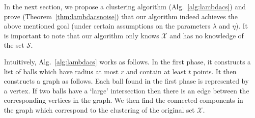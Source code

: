 \documentclass[letterpaper,12pt,titlepage,oneside,final]{book}
\newcommand{\mc}{\mathcal}
\begin{document}
In the next section, we propose a clustering algorithm (Alg.~\ref{alg:lambdacs}) and prove (Theorem~\ref{thm:lambdacsnoise}) that our algorithm indeed achieves the above mentioned goal (under certain assumptions on the parameters $\lambda$ and $\eta$). It is important to note that our algorithm only knows $\mc X$ and has no knowledge of the set $\mc S$. 

Intuitively, Alg.~\ref{alg:lambdacs} works as follows. In the first phase, it constructs a list of balls which have radius at most $r$ and contain at least $t$ points. It then constructs a graph as follows. Each ball found in the first phase is represented by a vertex. If two balls have a `large' intersection then there is an edge between the corresponding vertices in the graph. We then find the connected components in the graph which correspond to the clustering of the original set $\mc X$. 
\end{document}
